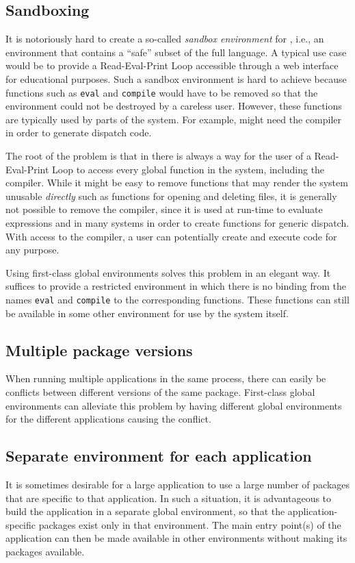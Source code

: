 \subsection{Sandboxing}

It is notoriously hard to create a so-called \emph{sandbox
  environment} for \commonlisp{}, i.e., an environment that contains a
``safe'' subset of the full language.  A typical use case would be to
provide a Read-Eval-Print Loop accessible through a web interface for
educational purposes.  Such a sandbox environment is hard to achieve
because functions such as \texttt{eval} and \texttt{compile} would
have to be removed so that the environment could not be destroyed by a
careless user.  However, these functions are typically used by parts
of the system.  For example, \clos{} might need the compiler in order
to generate dispatch code.

The root of the problem is that in \commonlisp{} there is always a way
for the user of a Read-Eval-Print Loop to access every global function
in the system, including the compiler.  While it might be easy to
remove functions that may render the system unusable \emph{directly}
such as functions for opening and deleting files, it is generally not
possible to remove the compiler, since it is used at run-time to
evaluate expressions and in many systems in order to create functions
for generic dispatch.  With access to the compiler, a user can
potentially create and execute code for any purpose.

Using first-class global environments solves this problem in an
elegant way.  It suffices to provide a restricted environment in which
there is no binding from the names \texttt{eval} and \texttt{compile}
to the corresponding functions.  These functions can still be
available in some other environment for use by the system itself.

\subsection{Multiple package versions}

When running multiple applications in the same \commonlisp{} process,
there can easily be conflicts between different versions of the same
package.  First-class global environments can alleviate this problem
by having different global environments for the different applications
causing the conflict.%

\subsection{Separate environment for each application}

It is sometimes desirable for a large application to use a large
number of packages that are specific to that application.  In such a
situation, it is advantageous to build the application in a separate
global environment, so that the application-specific packages exist
only in that environment.  The main entry point(s) of the application
can then be made available in other environments without making its
packages available.%

